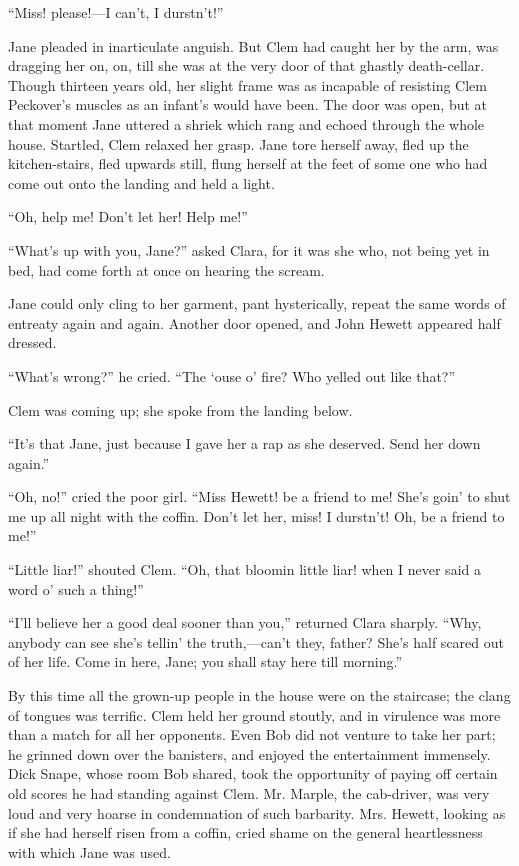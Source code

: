 ``Miss! please!---I can't, I durstn't!''

Jane pleaded in inarticulate anguish. But Clem had caught her by the
arm, was {\protect\hypertarget{88}{}{}}dragging her on, on, till she was
at the very door of that ghastly death-cellar. Though thirteen years
old, her slight frame was as incapable of resisting Clem Peckover's
muscles as an infant's would have been. The door was open, but at that
moment Jane uttered a shriek which rang and echoed through the whole
house. Startled, Clem relaxed her grasp. Jane tore herself away, fled up
the kitchen-stairs, fled upwards still, flung herself at the feet of
some one who had come out onto the landing and held a light.

``Oh, help me! Don't let her! Help me!''

``What's up with you, Jane?'' asked Clara, for it was she who, not being
yet in bed, had come forth at once on hearing the scream.

Jane could only cling to her garment, pant hysterically, repeat the same
words of entreaty again and again. Another door opened, and John Hewett
appeared half dressed.

``What's wrong?'' he cried. ``The `ouse o' fire? Who yelled out like
that?''

Clem was coming up; she spoke from the landing below.

{\protect\hypertarget{89}{}{}}``It's that Jane, just because I gave her
a rap as she deserved. Send her down again.''

``Oh, no!'' cried the poor girl. ``Miss Hewett! be a friend to me! She's
goin' to shut me up all night with the coffin. Don't let her, miss! I
durstn't! Oh, be a friend to me!''

``Little liar!'' shouted Clem. ``Oh, that bloomin little liar! when I
never said a word o' such a thing!''

``I'll believe her a good deal sooner than you,'' returned Clara
sharply. ``Why, anybody can see she's tellin' the truth,---can't they,
father? She's half scared out of her life. Come in here, Jane; you shall
stay here till morning.''

By this time all the grown-up people in the house were on the staircase;
the clang of tongues was terrific. Clem held her ground stoutly, and in
virulence was more than a match for all her opponents. Even Bob did not
venture to take her part; he grinned down over the banisters, and
enjoyed the entertainment immensely. Dick Snape, whose
{\protect\hypertarget{90}{}{}}room Bob shared, took the opportunity of
paying off certain old scores he had standing against Clem. Mr. Marple,
the cab-driver, was very loud and very hoarse in condemnation of such
barbarity. Mrs. Hewett, looking as if she had herself risen from a
coffin, cried shame on the general heartlessness with which Jane was
used.

